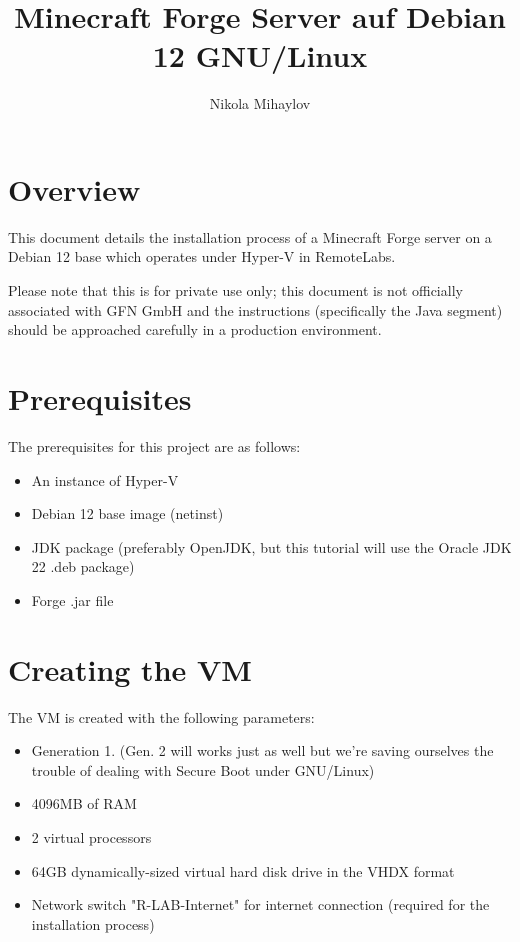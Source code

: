 \documentclass[]{article}
\title{Minecraft Forge Server auf Debian 12 GNU/Linux}
\author{Nikola Mihaylov}
\begin{document}
\maketitle

\section{Overview}

This document details the installation process of a Minecraft Forge server on a Debian 12 base which operates under Hyper-V in RemoteLabs.

Please note that this is for private use only; this document is not officially associated with GFN GmbH and the instructions (specifically the Java segment) should be approached carefully in a production environment.

\section{Prerequisites}

The prerequisites for this project are as follows:

\begin{itemize}
	\item An instance of Hyper-V
	\item Debian 12 base image (netinst)
	\item JDK package (preferably OpenJDK, but this tutorial will use the Oracle JDK 22 .deb package)
	\item Forge .jar file
\end{itemize}

\section{Creating the VM}

The VM is created with the following parameters:

\begin{itemize}
	\item Generation 1. (Gen. 2 will works just as well but we're saving ourselves the trouble of dealing with Secure Boot under GNU/Linux)
	\item 4096MB of RAM
	\item 2 virtual processors
	\item 64GB dynamically-sized virtual hard disk drive in the VHDX format
	\item Network switch "R-LAB-Internet" for internet connection (required for the installation process)
\end{itemize}
\end{document}
